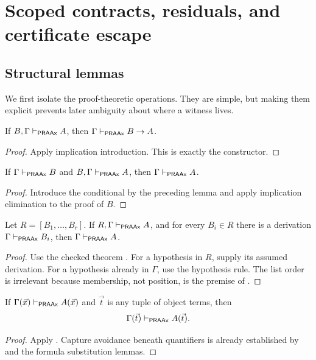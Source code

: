 \section{Scoped contracts, residuals, and certificate escape}
\label{sec:scope-contracts}

\subsection{Structural lemmas}

We first isolate the proof-theoretic operations.  They are simple, but making them explicit prevents later ambiguity about where a witness lives.

\begin{lemma}
If \(B,\Gamma\vdash_{\mathsf{PRAAx}} A\), then \(\Gamma\vdash_{\mathsf{PRAAx}} B\to A\).
\end{lemma}
\begin{proof}
Apply implication introduction.  This is exactly the  constructor.
\end{proof}

\begin{lemma}
If \(\Gamma\vdash_{\mathsf{PRAAx}} B\) and \(B,\Gamma\vdash_{\mathsf{PRAAx}} A\), then \(\Gamma\vdash_{\mathsf{PRAAx}}A\).
\end{lemma}
\begin{proof}
Introduce the conditional by the preceding lemma and apply implication elimination to the proof of \(B\).
\end{proof}

\begin{lemma}
Let \(R=[B_1,\ldots,B_r]\).  If \(R,\Gamma\vdash_{\mathsf{PRAAx}}A\), and for every \(B_i\in R\) there is a derivation \(\Gamma\vdash_{\mathsf{PRAAx}}B_i\), then \(\Gamma\vdash_{\mathsf{PRAAx}}A\).
\end{lemma}
\begin{proof}
Use the checked theorem .  For a hypothesis in \(R\), supply its assumed derivation.  For a hypothesis already in \(\Gamma\), use the hypothesis rule.  The list order is irrelevant because membership, not position, is the premise of .
\end{proof}

\begin{lemma}[Specialization]
If \(\Gamma(\vec x)\vdash_{\mathsf{PRAAx}}A(\vec x)\) and \(\vec t\) is any tuple of object terms, then
\[
  \Gamma(\vec t)\vdash_{\mathsf{PRAAx}}A(\vec t).
\]
\end{lemma}
\begin{proof}
Apply .  Capture avoidance beneath quantifiers is already established by  and the formula substitution lemmas.
\end{proof}

